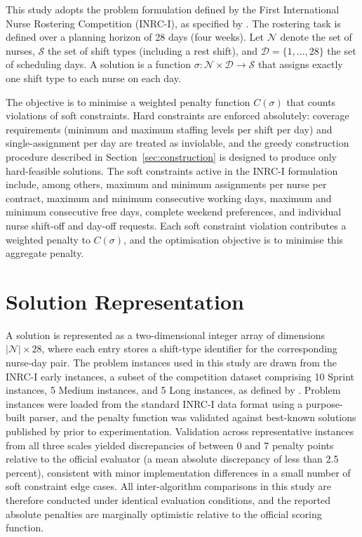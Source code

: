 \documentclass[12pt, a4paper, oneside]{report}
\begin{document}
This study adopts the problem formulation defined by the First
International Nurse Rostering Competition (INRC-I), as specified by
\citet{Haspeslagh2010}. The rostering task is defined over a planning
horizon of 28 days (four weeks). Let $\mathcal{N}$ denote the set of
nurses, $\mathcal{S}$ the set of shift types (including a rest shift),
and $\mathcal{D} = \{1, \ldots, 28\}$ the set of scheduling days. A
solution is a function $\sigma : \mathcal{N} \times \mathcal{D}
\rightarrow \mathcal{S}$ that assigns exactly one shift type to each
nurse on each day.

The objective is to minimise a weighted penalty function $C(\sigma)$
that counts violations of soft constraints. Hard constraints are
enforced absolutely: coverage requirements (minimum and maximum
staffing levels per shift per day) and single-assignment per day are
treated as inviolable, and the greedy construction procedure
described in Section~\ref{sec:construction} is designed to produce
only hard-feasible solutions. The soft constraints active in the
INRC-I formulation include, among others, maximum and minimum
assignments per nurse per contract, maximum and minimum consecutive
working days, maximum and minimum consecutive free days, complete
weekend preferences, and individual nurse shift-off and day-off
requests. Each soft constraint violation contributes a weighted
penalty to $C(\sigma)$, and the optimisation objective is to minimise
this aggregate penalty.

\section{Solution Representation}
\label{sec:representation}

A solution is represented as a two-dimensional integer array of
dimensions $|\mathcal{N}| \times 28$, where each entry stores a
shift-type identifier for the corresponding nurse-day pair. The
problem instances used in this study are drawn from the INRC-I
early instances, a subset of the competition dataset comprising 10
Sprint instances, 5 Medium instances, and 5 Long
instances, as defined by \citet{Haspeslagh2010}. Problem instances
were loaded from the standard INRC-I data format using a purpose-built
parser, and the penalty function was validated against best-known
solutions published by \citet{Toffolo2014} prior to experimentation.
Validation across representative instances from all three scales
yielded discrepancies of between 0 and 7 penalty points relative to
the official evaluator (a mean absolute discrepancy of less than 2.5
percent), consistent with minor implementation differences in a small
number of soft constraint edge cases. All inter-algorithm comparisons
in this study are therefore conducted under identical evaluation
conditions, and the reported absolute penalties are marginally
optimistic relative to the official scoring function.
\end{document}
